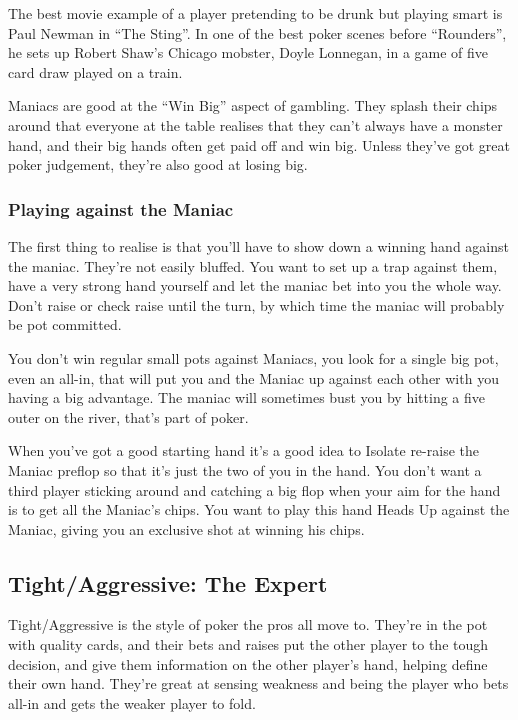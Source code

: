 The best movie example of a player pretending to be drunk but playing
smart is Paul Newman in ``The Sting''. In one of the best poker scenes
before ``Rounders'', he sets up Robert Shaw's Chicago mobster,
Doyle Lonnegan, in a game of five card draw played on a train.

Maniacs are good at the ``Win Big'' aspect of gambling. They splash
their chips around that everyone at the table realises that they
can't always have a monster hand, and their big hands often get
paid off and win big. Unless they've got great poker judgement, they're
also good at losing big.

\subsubsection{Playing against the Maniac}

The first thing to realise is that you'll have to show down a winning
hand against the maniac. They're not easily bluffed. You want to set up a
trap against them, have a very strong hand yourself and let the maniac
bet into you the whole way. Don't raise or check raise until
the turn, by which time the maniac will probably be pot committed.

You don't win regular small pots against Maniacs, you look for a single big
pot, even an all-in, that will put you and the Maniac up against each
other with you having a big advantage. The maniac will sometimes bust
you by hitting a five outer on the river, that's part of poker.

When you've got a good starting hand it's a good idea to Isolate
re-raise the Maniac preflop so that it's just the two of you in the
hand. You don't want a third player sticking around and catching a big
flop when your aim for the hand is to get all the Maniac's chips.
You want to play this hand Heads Up against the Maniac, giving you an
exclusive shot at winning his chips.

\subsection{Tight/Aggressive: The Expert}

Tight/Aggressive is the style of poker the pros all move to. They're
in the pot with quality cards, and their bets and raises put the
other player to the tough decision, and give them information on
the other player's hand, helping define their own hand. They're great
at sensing weakness and being the player who bets all-in and gets
the weaker player to fold.


